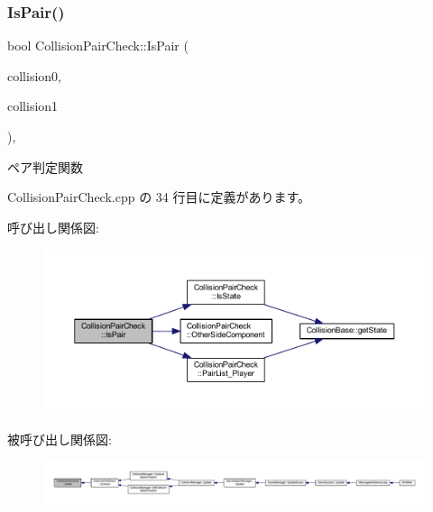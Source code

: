 \subsubsection{\texorpdfstring{Is\+Pair()}{IsPair()}}
{\footnotesize\ttfamily bool Collision\+Pair\+Check\+::\+Is\+Pair (\begin{DoxyParamCaption}\item[{\mbox{\hyperlink{class_collision_base}{Collision\+Base}} $\ast$}]{collision0,  }\item[{\mbox{\hyperlink{class_collision_base}{Collision\+Base}} $\ast$}]{collision1 }\end{DoxyParamCaption})\hspace{0.3cm}{\ttfamily [static]}, {\ttfamily [private]}}



ペア判定関数 



 Collision\+Pair\+Check.\+cpp の 34 行目に定義があります。

呼び出し関係図\+:\nopagebreak
\begin{figure}[H]
\begin{center}
\leavevmode
\includegraphics[width=350pt]{class_collision_pair_check_a52eefe9e5b104075d4c812ca9b68ff16_cgraph}
\end{center}
\end{figure}
被呼び出し関係図\+:
\nopagebreak
\begin{figure}[H]
\begin{center}
\leavevmode
\includegraphics[width=350pt]{class_collision_pair_check_a52eefe9e5b104075d4c812ca9b68ff16_icgraph}
\end{center}
\end{figure}
\mbox{\label{class_collision_pair_check_ab0f449965867269dc3115e831547a869}} 
